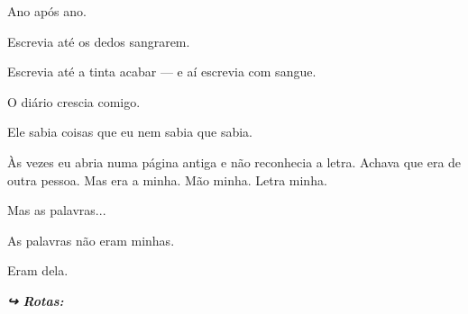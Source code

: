 \noindent Ano após ano.

\noindent Escrevia até os dedos sangrarem.

\noindent Escrevia até a tinta acabar --- e aí escrevia com sangue.

\noindent O diário crescia comigo.

\noindent Ele sabia coisas que eu nem sabia que sabia.

\noindent Às vezes eu abria numa página antiga e não reconhecia a letra. Achava que era de outra pessoa. Mas era a minha. Mão minha. Letra minha.

\noindent Mas as palavras...

\noindent As palavras não eram minhas.

\noindent Eram dela.

\vspace{0.5em}
\noindent\textit{\textbf{↪ Rotas:}  \rotasep {}}